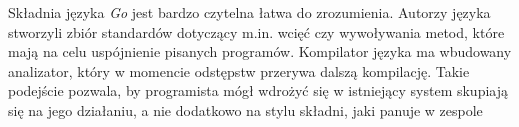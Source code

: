 Składnia języka \textsl{Go} jest bardzo czytelna łatwa do zrozumienia. Autorzy języka stworzyli zbiór standardów dotyczący m.in. wcięć czy wywoływania metod, które mają na celu uspójnienie pisanych programów. Kompilator języka ma wbudowany analizator, który w momencie odstępstw przerywa dalszą kompilację. Takie podejście pozwala, by programista mógł wdrożyć się w istniejący system skupiają się na jego działaniu, a nie dodatkowo na stylu składni, jaki panuje w zespole
